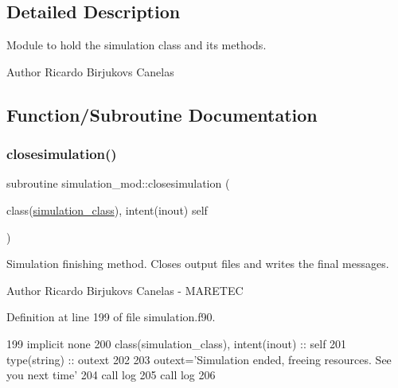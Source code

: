 \subsection{Detailed Description}
Module to hold the simulation class and its methods. 

\begin{DoxyAuthor}{Author}
Ricardo Birjukovs Canelas 
\end{DoxyAuthor}


\subsection{Function/\+Subroutine Documentation}
\mbox{\label{namespacesimulation__mod_a4285722eaa589fa671233554b54c74f8}} 
\subsubsection{\texorpdfstring{closesimulation()}{closesimulation()}}
{\footnotesize\ttfamily subroutine simulation\+\_\+mod\+::closesimulation (\begin{DoxyParamCaption}\item[{class(\mbox{\hyperlink{structsimulation__mod_1_1simulation__class}{simulation\+\_\+class}}), intent(inout)}]{self }\end{DoxyParamCaption})\hspace{0.3cm}{\ttfamily [private]}}



Simulation finishing method. Closes output files and writes the final messages. 

\begin{DoxyAuthor}{Author}
Ricardo Birjukovs Canelas -\/ M\+A\+R\+E\+T\+EC 
\end{DoxyAuthor}


Definition at line 199 of file simulation.\+f90.


\begin{DoxyCode}
199     \textcolor{keywordtype}{implicit none}
200     \textcolor{keywordtype}{class}(simulation\_class), \textcolor{keywordtype}{intent(inout)} :: self
201     \textcolor{keywordtype}{type}(string) :: outext
202 
203     outext=\textcolor{stringliteral}{'Simulation ended, freeing resources. See you next time'}
204     \textcolor{keyword}{call }log%
205     \textcolor{keyword}{call }log%
206 
\end{DoxyCode}
\mbox{\label{namespacesimulation__mod_a2b8198a9fb3f7671c6b45192a0b9740c}} 
